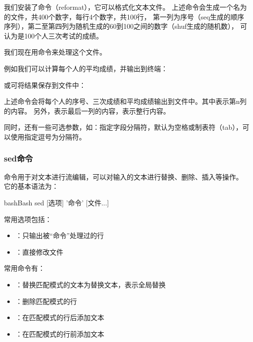 我们安装了命令（reformat），它可以格式化文本文件。
上述命令会生成一个名为的文件，共400个数字，每行4个数字，共100行，
第一列为序号（seq生成的顺序序列），第二至第四列为随机生成的60到100之间的数字（shuf生成的随机数），
可认为是100个人三次考试的成绩。

我们现在用命令来处理这个文件。

例如我们可以计算每个人的平均成绩，并输出到终端：

或可将结果保存到文件中：

上述命令会将每个人的序号、三次成绩和平均成绩输出到文件中。其中表示第n列的内容。
另外，表示最后一列的内容，表示整行内容。

同时，还有一些可选参数，如：指定字段分隔符，默认为空格或制表符（tab），可以使用指定逗号为分隔符。

\subsubsection{sed命令}
命令用于对文本进行流编辑，可以对输入的文本进行替换、删除、插入等操作。
它的基本语法为：
\begin{envcode}{bash}{Bash}
sed [选项] '命令' [文件...]
\end{envcode}
常用选项包括：
\begin{itemize}
\item {}：只输出被“命令”处理过的行
\item {}：直接修改文件
\end{itemize}

常用命令有：
\begin{itemize}
\item {}：替换匹配模式的文本为替换文本，表示全局替换
\item {}：删除匹配模式的行
\item {}：在匹配模式的行后添加文本
\item {}：在匹配模式的行前添加文本
\end{itemize}

